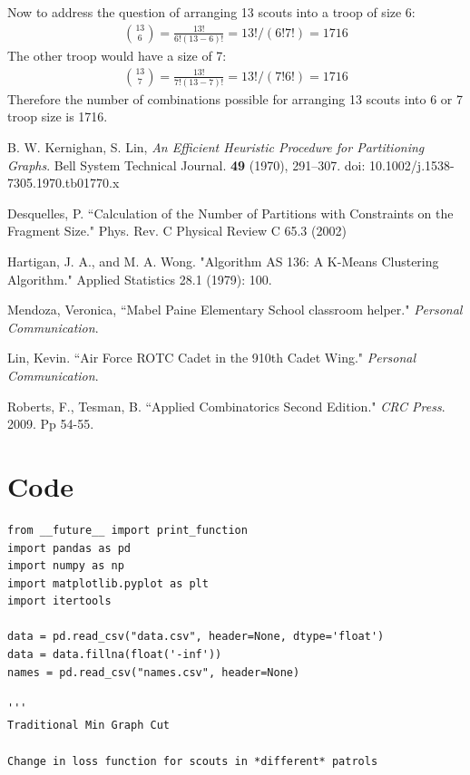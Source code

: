\documentclass{amsart}
\theoremstyle{definition}
\theoremstyle{remark}
\numberwithin{equation}{section}
\begin{document}
Now to address the question of arranging 13 scouts into a troop of size 6:
\begin{gather*}
	\binom{13}{6} = \frac{13!}{6!(13-6)!} = 13!/(6!7!) = 1716
\end{gather*}
The other troop would have a size of 7:
\begin{gather*}
	\binom{13}{7} = \frac{13!}{7!(13-7)!} = 13!/(7!6!) = 1716
\end{gather*}
Therefore the number of combinations possible for arranging 13 scouts into 6 or 7 troop size is 1716.

\begin{thebibliography}{10}

 B. W. Kernighan, S. Lin, \textit{An Efficient Heuristic Procedure for Partitioning Graphs}. Bell System Technical Journal. \textbf{49} (1970), 291--307. doi: 10.1002/j.1538-7305.1970.tb01770.x

 Desquelles, P. ``Calculation of the Number of Partitions with Constraints on the Fragment Size." Phys. Rev. C Physical Review C 65.3 (2002)

 Hartigan, J. A., and M. A. Wong. "Algorithm AS 136: A K-Means Clustering Algorithm." Applied Statistics 28.1 (1979): 100.

 Mendoza, Veronica, ``Mabel Paine Elementary School classroom helper." \textit{Personal Communication}.

 Lin, Kevin. ``Air Force ROTC Cadet in the 910th Cadet Wing." \textit{Personal Communication}.

 Roberts, F., Tesman, B. ``Applied Combinatorics Second Edition." \textit{CRC Press}. 2009. Pp 54-55.

\clearpage

\section*{Code}

\begin{lstlisting}
from __future__ import print_function
import pandas as pd
import numpy as np
import matplotlib.pyplot as plt
import itertools

data = pd.read_csv("data.csv", header=None, dtype='float')
data = data.fillna(float('-inf'))
names = pd.read_csv("names.csv", header=None)

'''
Traditional Min Graph Cut

Change in loss function for scouts in *different* patrols


\end{lstlisting}
\end{thebibliography}
\end{document}
